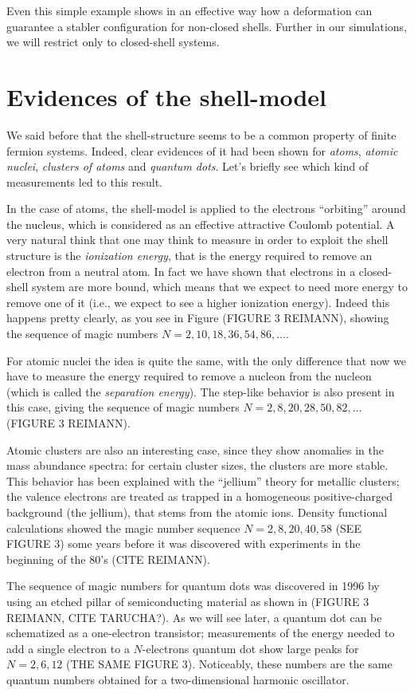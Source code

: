 \documentclass[a4paper,twoside,11pt]{book}
\begin{document}
Even this simple example shows in an effective way how a deformation can guarantee a stabler configuration for non-closed shells. Further in our simulations, we will restrict only to closed-shell systems.

\section{Evidences of the shell-model}
We said before that the shell-structure seems to be a common property of finite fermion systems. Indeed, clear evidences of it had been shown for \emph{atoms}, \emph{atomic nuclei}, \emph{clusters of atoms} and \emph{quantum dots}. Let's briefly see which kind of measurements led to this result.

In the case of atoms, the shell-model is applied to the electrons ``orbiting'' around the nucleus, which is considered as an effective attractive Coulomb potential. A very natural think that one may think to measure in order to exploit the shell structure is the \emph{ionization energy}, that is the energy required to remove an electron from a neutral atom. In fact we have shown that electrons in a closed-shell system are more bound, which means that we expect to need more energy to remove one of it (i.e., we expect to see a higher ionization energy). Indeed this happens pretty clearly, as you see in Figure (FIGURE 3 REIMANN), showing the sequence of magic numbers $N=2,10,18,36,54,86,\ldots$.

For atomic nuclei the idea is quite the same, with the only difference that now we have to measure the energy required to remove a nucleon from the nucleon (which is called the \emph{separation energy}). The step-like behavior is also present in this case, giving the sequence of magic numbers $N=2,8,20,28,50,82,\ldots$ (FIGURE 3 REIMANN).

Atomic clusters are also an interesting case, since they show anomalies in the mass abundance spectra: for certain cluster sizes, the clusters are more stable. This behavior has been explained with the ``jellium'' theory for metallic clusters; the valence electrons are treated as trapped in a homogeneous positive-charged background (the jellium), that stems from the atomic ions. Density functional calculations showed the magic number sequence $N=2,8,20,40,58$ (SEE FIGURE 3) some years before it was discovered with experiments in the beginning of the 80's (CITE REIMANN).

The sequence of magic numbers for quantum dots was discovered in 1996 by using an etched pillar of semiconducting material as shown in (FIGURE 3 REIMANN, CITE TARUCHA?). As we will see later, a quantum dot can be schematized as a one-electron transistor; measurements of the energy needed to add a single electron to a $N$-electrons quantum dot show large peaks for $N=2,6,12$ (THE SAME FIGURE 3). Noticeably, these numbers are the same quantum numbers obtained for a two-dimensional harmonic oscillator.
\end{document}
